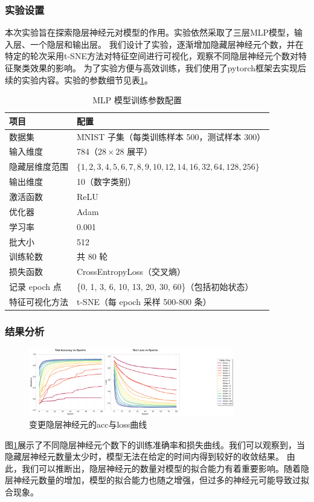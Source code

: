 \documentclass[12pt,a4paper]{article}
\begin{document}
\subsubsection{实验设置}
本次实验旨在探索隐层神经元对模型的作用。实验依然采取了三层MLP模型，输入层、一个隐层和输出层。
我们设计了实验，逐渐增加隐藏层神经元个数，并在特定的轮次采用t-SNE方法对特征空间进行可视化，观察不同隐层神经元个数对特征聚类效果的影响。
为了实验方便与高效训练，我们使用了pytorch框架去实现后续的实验内容。实验的参数细节见表\ref{tab:training-config}。
\begin{table}[H]
\centering
\caption{MLP 模型训练参数配置}
\begin{tabular}{ll}
\toprule
\textbf{项目} & \textbf{配置} \\
\midrule
数据集        & MNIST 子集（每类训练样本 500，测试样本 300） \\
输入维度        & 784（$28 \times 28$ 展平） \\
隐藏层维度范围  & $\{1, 2, 3, 4, 5, 6, 7, 8, 9, 10, 12, 14, 16, 32, 64, 128, 256\}$ \\
输出维度        & 10（数字类别） \\
激活函数        & ReLU \\
优化器          & Adam \\
学习率          & 0.001 \\
批大小          & 512 \\
训练轮数        & 共 80 轮 \\
损失函数        & CrossEntropyLoss（交叉熵） \\
记录 epoch 点   & \{0, 1, 3, 6, 10, 13, 20, 30, 60\}（包括初始状态） \\
特征可视化方法  & t-SNE（每 epoch 采样 500-800 条） \\
\bottomrule
\end{tabular}
\label{tab:training-config}
\end{table}

\subsubsection{结果分析}
\begin{figure}[H]
    \centering
    \includegraphics[width=0.8\textwidth]{../images/mlp_curves_Spectral.png}
    \caption{变更隐层神经元的acc与loss曲线}
    \label{fig:hidden}
\end{figure}
图\ref{fig:hidden}展示了不同隐层神经元个数下的训练准确率和损失曲线。我们可以观察到，当隐藏层神经元数量太少时，模型无法在给定的时间内得到较好的收敛结果。
由此，我们可以推断出，隐层神经元的数量对模型的拟合能力有着重要影响。随着隐层神经元数量的增加，模型的拟合能力也随之增强，但过多的神经元可能导致过拟合现象。
\end{document}

